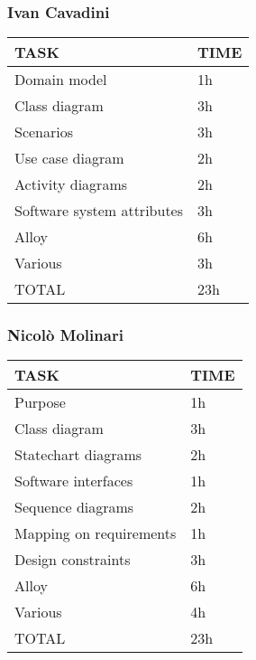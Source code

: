 
\hfill
\subsubsection{Ivan Cavadini}
\hfill
\begin{center}
	\begin{tabular}{ | l | p{6cm} | } 
		\hline
		TASK & TIME \\ 
		\hline
		Domain model & 1h  \\ 
		\hline
		Class diagram & 3h  \\ 
		\hline
		Scenarios & 3h \\ 
		\hline
		Use case diagram & 2h \\ 
		\hline
		Activity diagrams & 2h \\ 
		\hline
		Software system attributes & 3h \\ 
		\hline
		Alloy & 6h   \\ 
		\hline
		Various & 3h  \\ 
		\hline
		TOTAL & 23h \\ 
		\hline
	\end{tabular}
\end{center}
\hfill
\subsubsection{Nicolò Molinari}
\hfill
\begin{center}
	\begin{tabular}{ | l | p{6cm} | } 
		\hline
		TASK & TIME \\ 
		\hline
		Purpose & 1h  \\ 
		\hline
		Class diagram & 3h  \\ 
		\hline
		Statechart diagrams & 2h \\ 
		\hline
		Software interfaces & 1h \\ 
		\hline
		Sequence diagrams & 2h \\ 
		\hline
		Mapping on requirements & 1h   \\ 
		\hline
		Design constraints & 3h  \\ 
		\hline
		Alloy & 6h \\ 
		\hline
		Various & 4h \\ 
		\hline
		TOTAL & 23h \\ 
		\hline
	\end{tabular}
\end{center}
\hfill
\newpage
